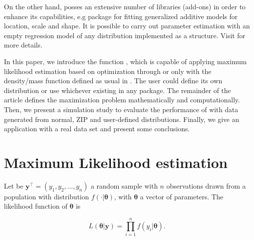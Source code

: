 \documentclass[nojss]{jss}
\begin{document}
On the other hand,  posses an extensive number of libraries (add-ons) in order to enhance its capabilities, e.g   package \citep{Stasinopoulos+Rigby:2007} for fitting generalized additive models for location, scale and shape. It is possible to carry out parameter estimation with an empty regression model of any distribution implemented as a  structure. Visit \cite{Stasinopoulos2017} for more details.

In this paper, we introduce the function , which is capable of applying maximum likelihood estimation based on optimization through  or  only with the density/mass function defined as usual in . The user could define its own distribution or use whichever existing in any package. The remainder of the article defines the maximization problem mathematically and computationally. Then, we present a simulation study to evaluate the performance of  with data generated from normal, ZIP and user-defined distributions. Finally, we give an application with a real data set and present some conclusions.



\section{Maximum Likelihood estimation} \label{sec:MLE}

Let be $\boldsymbol{y}^\top=(y_1,y_2,...,y_n)$ a random sample with $n$ observations drawn from a population with distribution $f(\cdot|\boldsymbol{\theta})$, with $\boldsymbol{\theta}$ a vector of parameters. The likelihood function of $\boldsymbol{\theta}$ is

\begin{equation}
L(\boldsymbol{\theta}|\bm{y}) = \prod_{i=1}^{n}
f(y_i|\boldsymbol{\theta}).
\end{equation}
\end{document}
